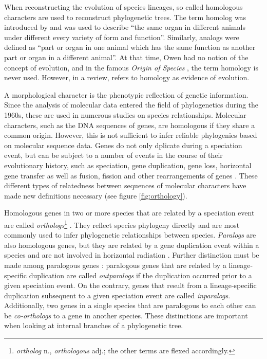 When reconstructing the evolution of species lineages, so called homologous
characters are used to reconstruct phylogenetic trees. The term homolog was
introduced by \citet{owen1848} and was used to describe ``the same organ in
different animals under different every variety of form and function''.
Similarly, analogs were defined as ``part or organ in one animal which has the
same function as another part or organ in a different animal''. At that time,
Owen had no notion of the concept of evolution, and in the famous \emph{Origin
of Species} \citep{darwin1859}, the term homology is never used. However, in a
review, \citet{owen1860} refers to homology as evidence of evolution.

A morphological character is the phenotypic reflection of genetic information.
Since the analysis of molecular data entered the field of phylogenetics during
the 1960s, these are used in numerous studies on species relationships.
Molecular characters, such as the DNA sequences of genes, are homologous if they
share a common origin. However, this is not sufficient to infer reliable
phylogenies based on molecular sequence data. Genes do not only dplicate during
a speciation event, but can be subject to a number of events in the course of
their evolutionary history, such as speciation, gene duplication, gene loss,
horizontal gene transfer as well as fusion, fission and other rearrangements of
genes \citep{koonin2005}.  These different types of relatedness between
sequences of molecular characters have made new definitions necessary (see
figure \ref{fig:orthology}).



Homologous genes in two or more species that are related by a speciation event
are called \emph{orthologs}\footnote{\emph{ortholog} n., \emph{orthologous}
adj.; the other terms are flexed accordingly.} \citep{fitch1970}. They reflect
species phylogeny directly and are most commonly used to infer phylogenetic
relationships between species. \emph{Paralogs} are also homologous genes, but
they are related by a gene duplication event within a species and are not
involved in horizontal radiation \citep{ohno1970}. Further distinction must be
made among paralogous genes \citep{remm2001}: paralogous genes that are related
by a lineage-specific duplication are called \emph{outparalogs} if the
duplication occurred prior to a given speciation event. On the contrary, genes
that result from a lineage-specific duplication subsequent to a given speciation
event are called \emph{inparalogs}. Additionally, two genes in a single species
that are paralogous to each other can be \emph{co-orthologs} to a gene in
another species. These distinctions are important when looking at internal
branches of a phylogenetic tree. 

